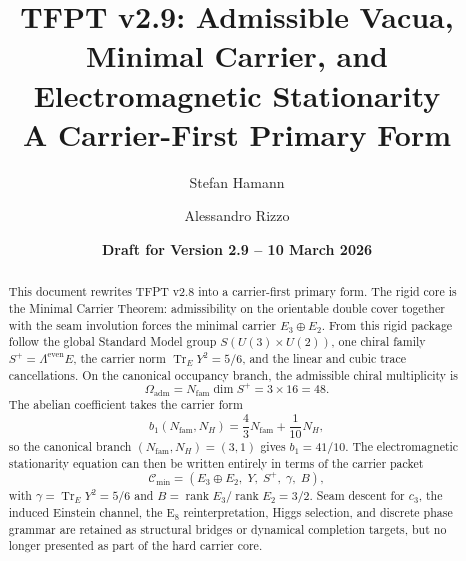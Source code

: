 \documentclass[11pt,a4paper]{article}
\title{%
    \textbf{TFPT v2.9: Admissible Vacua, Minimal Carrier, and Electromagnetic Stationarity}\\[0.5em]
    \Large A Carrier-First Primary Form
}
\author{Stefan Hamann \and Alessandro Rizzo}
\date{\textbf{Draft for Version 2.9 -- 10 March 2026}}
\theoremstyle{definition}
\theoremstyle{remark}
\newcommand{\cthree}{c_3}
\newcommand{\bone}{b_1}
\newcommand{\tr}{\operatorname{Tr}}
\newcommand{\rank}{\operatorname{rank}}
\newcommand{\Oadm}{\Omega_{\mathrm{adm}}}
\newcommand{\Cmin}{\mathcal C_{\min}}
\begin{document}
\maketitle

\begin{abstract}
This document rewrites TFPT v2.8 into a carrier-first primary form. The rigid core is the Minimal Carrier Theorem: admissibility on the orientable double cover together with the seam involution forces the minimal carrier $E_3\oplus E_2$. From this rigid package follow the global Standard Model group $S(U(3)\times U(2))$, one chiral family $S^+=\Lambda^{\mathrm{even}}E$, the carrier norm $\tr_EY^2=5/6$, and the linear and cubic trace cancellations. On the canonical occupancy branch, the admissible chiral multiplicity is
\[
\Oadm = N_{\mathrm{fam}}\dim S^+ = 3\times16 = 48.
\]
The abelian coefficient takes the carrier form
\[
\bone(N_{\mathrm{fam}},N_H)=\frac43 N_{\mathrm{fam}}+\frac1{10}N_H,
\]
so the canonical branch $(N_{\mathrm{fam}},N_H)=(3,1)$ gives $\bone=41/10$. The electromagnetic stationarity equation can then be written entirely in terms of the carrier packet
\[
\Cmin=(E_3\oplus E_2,\;Y,\;S^+,\;\gamma,\;B),
\]
with $\gamma=\tr_EY^2=5/6$ and $B=\rank E_3/\rank E_2=3/2$. Seam descent for $\cthree$, the induced Einstein channel, the E$_8$ reinterpretation, Higgs selection, and discrete phase grammar are retained as structural bridges or dynamical completion targets, but no longer presented as part of the hard carrier core.
\end{abstract}
\end{document}
